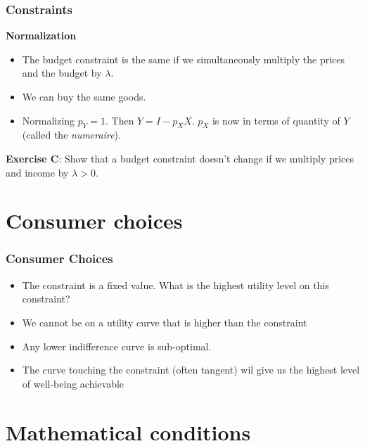\documentclass[handout]{beamer}
\begin{document}
\begin{frame}\frametitle{Constraints}
\textbf{Normalization}
\begin{itemize}
\item  The budget constraint is the same if we simultaneously multiply the prices and the budget by $\lambda$.
\item We can buy the same goods.\pause
\item Normalizing $p_Y = 1$. Then $Y = I - p_X X$. $p_X$ is now in terms of quantity of $Y$ (called the \textit{numeraire}). 
\end{itemize}
\textbf{Exercise C}: Show that a budget constraint doesn't change if we multiply prices and income by $\lambda>0$. 
\end{frame}

\section{Consumer choices}

\begin{frame}\frametitle{Consumer Choices}

\begin{itemize}
\item The constraint is a fixed value. What is the highest utility level on this constraint?

\item We cannot be on a utility curve that is higher than the constraint

\item Any lower indifference curve is sub-optimal.

\item The curve touching the constraint (often tangent) wil give us the highest level of well-being achievable
\end{itemize}

\end{frame}

\section{Mathematical conditions}
\end{document}
